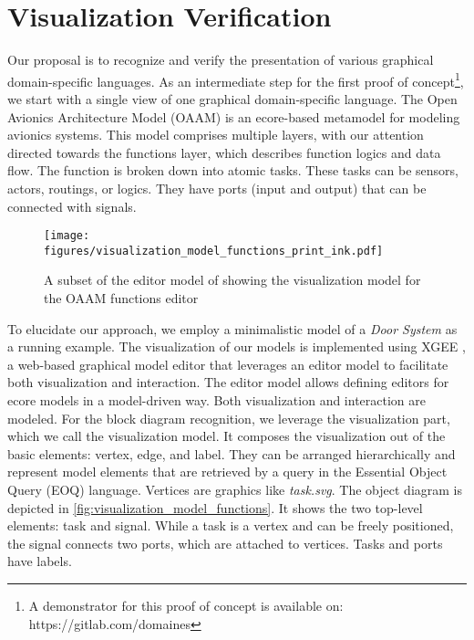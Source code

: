 \section{Visualization Verification}
Our proposal is to recognize and verify the presentation of various graphical domain-specific languages. As an intermediate step for the first proof of concept\footnote{A demonstrator for this proof of concept is available on: https://gitlab.com/domaines}, we start with a single view of one graphical domain-specific language. 
The Open Avionics Architecture Model (OAAM) \cite{Annighoefer2019} is an ecore-based metamodel for modeling avionics systems. This model comprises multiple layers, with our attention directed towards the functions layer, which describes function logics and data flow. The function is broken down into atomic tasks. These tasks can be sensors, actors, routings, or logics. They have ports (input and output) that can be connected with signals.

\begin{figure}[htb]
  \centering
  \texttt{[image: figures/visualization\_model\_functions\_print\_ink.pdf]}
  \caption{A subset of the editor model of \cite{Annighoefer2021} showing the visualization model for the OAAM functions editor}
  
  \label{fig:visualization_model_functions}
\end{figure}

To elucidate our approach, we employ a minimalistic model of a \emph{Door System} as a running example. 
The visualization of our models is implemented using XGEE \cite{Annighoefer2021}, a web-based graphical model editor that leverages an editor model to facilitate both visualization and interaction. The editor model allows defining editors for ecore models in a model-driven way. Both visualization and interaction are modeled. For the block diagram recognition, we leverage the visualization part, which we call the visualization model. It composes the visualization out of the basic elements: vertex, edge, and label. They can be arranged hierarchically and represent model elements that are retrieved by a query in the Essential Object Query (EOQ) \cite{Annighoefer2019} language. Vertices are graphics like \emph{task.svg}. The object diagram is depicted in \autoref{fig:visualization_model_functions}. It shows the two top-level elements: task and signal. While a task is a vertex and can be freely positioned, the signal connects two ports, which are attached to vertices. Tasks and ports have labels. 

